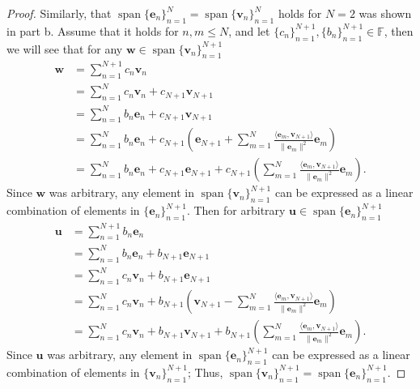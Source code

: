 \documentclass[12pt]{amsart}
\newcommand{\1}{\mathbbm{1}}
\numberwithin{equation}{section}
\numberwithin{Theorem}{section}
\theoremstyle{plain} %
\theoremstyle{definition}
\theoremstyle{remark}
\begin{document}
\begin{enumerate}[1.]
\begin{enumerate}[(a)]
\begin{proof}
		Similarly, that \(\operatorname{span} \{\mathbf{e}_{n}\}_{n=1}^{N} = \operatorname{span}\{\mathbf{v}_{n}\}_{n=1}^{N}\) holds for \(N=2\)
		was shown in part b. Assume that it holds for \(n,m\leq N\), 
		and let \(\{c_{n}\}_{n=1}^{N+1}, \{b_{n}\}_{n=1}^{N+1} \in \mathbb F\), 
		then we will see that for any 
		\(\mathbf w\in\operatorname{span} \{\mathbf{v}_{n}\}_{n=1}^{N+1}\)
		\begin{align*} \mathbf w
			&= \sum_{n=1}^{N+1}c_n\mathbf v_n \\
			&= \sum_{n=1}^{N}c_n\mathbf v_n + c_{N+1}\mathbf v_{N+1} \\
			&= \sum_{n=1}^{N}b_n\mathbf e_n + c_{N+1}\mathbf v_{N+1} \\
			&= \sum_{n=1}^{N}b_n\mathbf e_n + c_{N+1} \left( \mathbf{e}_{N+1}+\sum_{m=1}^{N}\frac{\langle\mathbf{e}_m,\mathbf{v}_{N+1}\rangle}{\|\mathbf{e}_m\|^2}\mathbf{e}_m \right) \\
			&= \sum_{n=1}^{N}b_n\mathbf e_n + c_{N+1} \mathbf{e}_{N+1}+c_{N+1}\left( \sum_{m=1}^{N}\frac{\langle\mathbf{e}_m,\mathbf{v}_{N+1}\rangle}{\|\mathbf{e}_m\|^2}\mathbf{e}_m \right).
		\end{align*}
		Since \(\mathbf w\) was arbitrary, any element in \(\operatorname{span} \{\mathbf{v}_{n}\}_{n=1}^{N+1}\) can be expressed as a 
		linear combination of elements in 
		\(\{\mathbf{e}_{n}\}_{n=1}^{N+1}\).
		Then for arbitrary \(\mathbf u\in\operatorname{span} \{\mathbf{e}_{n}\}_{n=1}^{N+1}\)
		\begin{align*} \mathbf u
			&= \sum_{n=1}^{N+1}b_n\mathbf e_n \\
			&= \sum_{n=1}^{N}b_n\mathbf e_n + b_{N+1}\mathbf e_{N+1} \\
			&= \sum_{n=1}^{N}c_n\mathbf v_n + b_{N+1}\mathbf e_{N+1} \\
			&= \sum_{n=1}^{N}c_n\mathbf v_n + b_{N+1} \left( \mathbf{v}_{N+1}-\sum_{m=1}^{N}\frac{\langle\mathbf{e}_m,\mathbf{v}_{N+1}\rangle}{\|\mathbf{e}_m\|^2}\mathbf{e}_m \right) \\
			&= \sum_{n=1}^{N}c_n\mathbf v_n + b_{N+1} \mathbf{v}_{N+1}+b_{N+1}\left( \sum_{m=1}^{N}\frac{\langle\mathbf{e}_m,\mathbf{v}_{N+1}\rangle}{\|\mathbf{e}_m\|^2}\mathbf{e}_m \right).
		\end{align*}
		Since \(\mathbf u\) was arbitrary, any element in \(\operatorname{span} \{\mathbf{e}_{n}\}_{n=1}^{N+1}\) can be expressed as a 
		linear combination of elements in 
		\(\{\mathbf{v}_{n}\}_{n=1}^{N+1}\);
		Thus, \( \operatorname{span} \{\mathbf{v}_{n}\}_{n=1}^{N+1} =
		\operatorname{span} \{\mathbf{e}_{n}\}_{n=1}^{N+1}\).
	\end{proof}


\end{enumerate}
\end{enumerate}
\end{document}
